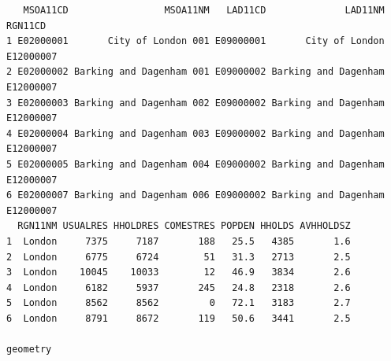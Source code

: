 \documentclass[
  letterpaper,
]{scrbook}
\begin{document}
\begin{verbatim}
   MSOA11CD                 MSOA11NM   LAD11CD              LAD11NM   RGN11CD
1 E02000001       City of London 001 E09000001       City of London E12000007
2 E02000002 Barking and Dagenham 001 E09000002 Barking and Dagenham E12000007
3 E02000003 Barking and Dagenham 002 E09000002 Barking and Dagenham E12000007
4 E02000004 Barking and Dagenham 003 E09000002 Barking and Dagenham E12000007
5 E02000005 Barking and Dagenham 004 E09000002 Barking and Dagenham E12000007
6 E02000007 Barking and Dagenham 006 E09000002 Barking and Dagenham E12000007
  RGN11NM USUALRES HHOLDRES COMESTRES POPDEN HHOLDS AVHHOLDSZ
1  London     7375     7187       188   25.5   4385       1.6
2  London     6775     6724        51   31.3   2713       2.5
3  London    10045    10033        12   46.9   3834       2.6
4  London     6182     5937       245   24.8   2318       2.6
5  London     8562     8562         0   72.1   3183       2.7
6  London     8791     8672       119   50.6   3441       2.5
                                                                                                                                                                                                                                                                                                                                                                                                                                                                                                                                                                                                                                                                                                                                                                                                                                                                                                                                                                                                                                                                                                                                                                                                                                                                                                                                                                                                                                                                                                                                                                                            geometry

\end{verbatim}
\end{document}
